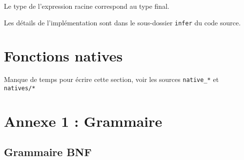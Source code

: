 \documentclass[paper=a4, fontsize=11pt]{scrartcl}
\numberwithin{equation}{section}		%
\numberwithin{figure}{section}			%
\numberwithin{table}{section}				%
\begin{document}
Le type de l'expression racine correspond au type final.


Les détails de l'implémentation sont dans le sous-dossier \texttt{infer} du code source.

\newpage
\section{Fonctions natives}

Manque de temps pour écrire cette section, voir les sources \texttt{native_*} et \texttt{natives/*}

\newpage
\section{Annexe 1 : Grammaire}

\subsection{Grammaire BNF}
\end{document}
